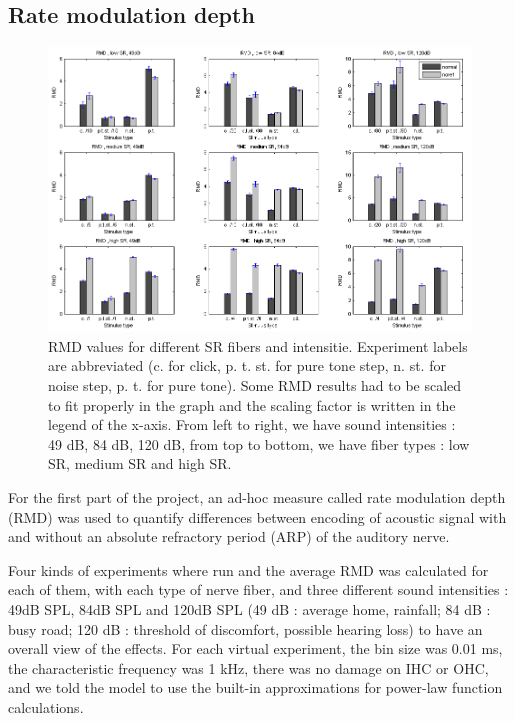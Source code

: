 
\subsection{Rate modulation depth}

\begin{figure}[ht]
	\centering
  \includegraphics[width=\textwidth]{images/rmds9.png} %
	\caption{RMD values for different SR fibers and intensitie. Experiment labels are abbreviated 
	(c. for click, p. t. st. for pure tone step, n. st. for noise step, p. t. for pure tone).
	Some RMD results had to be scaled to fit properly in the graph and the scaling factor is written in the legend of the x-axis.
	From left to right, we have sound intensities : 49 dB, 84 dB, 120 dB,
	from top to bottom, we have fiber types : low SR, medium SR and high SR.}
	\label{fig:rmds}
\end{figure}

For the first part of the project, an ad-hoc measure called rate 
modulation depth (RMD) was used to quantify differences between encoding 
of acoustic signal with and without an absolute refractory period (ARP) of the auditory nerve.

Four kinds of experiments where run and the average RMD was calculated 
for each of them, 
with each type of nerve fiber, and three different sound intensities : 
49dB SPL, 84dB SPL and 120dB SPL (49 dB : average home, rainfall; 84 dB : busy road; 120 dB : threshold of discomfort, possible hearing loss) 
to have an overall view of the effects.
For each virtual experiment, the bin size was 0.01 ms, the characteristic frequency was 1 kHz, 
there was no damage on IHC or OHC, and we told the model to use the built-in approximations 
for power-law function calculations.

